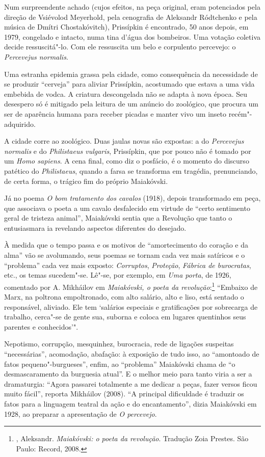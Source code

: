{Num surpreendente achado (cujos efeitos, na peça original, eram
potenciados pela direção de Vsiévolod Meyerhold, pela cenografia de
Aleksandr Ródtchenko e pela música de Dmítri Chostakóvitch), Prissípkin
é encontrado, 50 anos depois, em 1979, congelado e intacto, numa tina
d'água dos bombeiros. Uma votação coletiva decide ressuscitá"-lo. Com ele
ressuscita um belo e corpulento percevejo: o \emph{Percevejus normalis}.

Uma estranha epidemia grassa pela cidade, como consequência da
necessidade de se produzir ``cerveja'' para aliviar Prissípkin, acostumado
que estava a uma vida embebida de vodca. A criatura descongelada não se
adapta à nova época. Seu desespero só é mitigado pela leitura de um
anúncio do zoológico, que procura um ser de aparência humana para
receber picadas e manter vivo um inseto recém"-adquirido.

A cidade corre ao zoológico. Duas jaulas novas são expostas: a do
\emph{Percevejus normalis} e do \emph{Philistaeus vulgaris},
Prissípkin, que por pouco não é tomado por um \emph{Homo sapiens}. A
cena final, como diz o posfácio, é o momento do discurso patético do
\emph{Philistaeus}, quando a farsa se transforma em tragédia,
prenunciando, de certa forma, o trágico fim do próprio Maiakóvski.

Já no poema \emph{O bom tratamento dos cavalos} (1918), depois
transformado em peça, que associava o poeta a um cavalo desfalecido em
virtude de ``certo sentimento geral de tristeza animal'', Maiakóvski
sentia que a Revolução que tanto o entusiasmara ia revelando aspectos
diferentes do desejado.

À medida que o tempo passa e os motivos de ``amortecimento do coração e
da alma'' vão se avolumando, seus poemas se tornam cada vez mais
satíricos e o ``problema'' cada vez mais exposto: \emph{Corruptos},
\emph{Proteção}, \emph{Fábrica de burocratas}, etc., os temas
sucedem"-se. Lê"-se, por exemplo, em \emph{Uma porta}, de 1926, comentado
por A. Mikháilov em \emph{Maiakóvski, o poeta da revolução}:\footnote{,
  Aleksandr. \emph{Maiakóvski: o poeta da revolução}. Tradução Zoia
  Prestes. São Paulo: Record, 2008.} ``Embaixo de Marx, na poltrona
empoltronado, com alto salário, alto e liso, está sentado o responsável,
aliviado. Ele tem `salários especiais e gratificações por sobrecarga de
trabalho, cerca"-se de gente sua, suborna e coloca em lugares quentinhos
seus parentes e conhecidos'".

Nepotismo, corrupção, mesquinhez, burocracia, rede de ligações suspeitas
``necessárias'', acomodação, abafação: à exposição de tudo isso, ao
``amontoado de fatos pequeno"-burgueses'', enfim, ao ``problema'' Maiakóvski
chama de ``o desmascaramento da burguesia atual''. E o melhor meio para
tanto viria a ser a dramaturgia: ``Agora passarei totalmente a me dedicar
a peças, fazer versos ficou muito fácil'', reporta Mikháilov (2008). ``A
principal dificuldade é traduzir os fatos para a linguagem teatral da
ação e do encantamento'', dizia Maiakóvski em 1928, ao preparar a
apresentação de \emph{O percevejo}.

}
